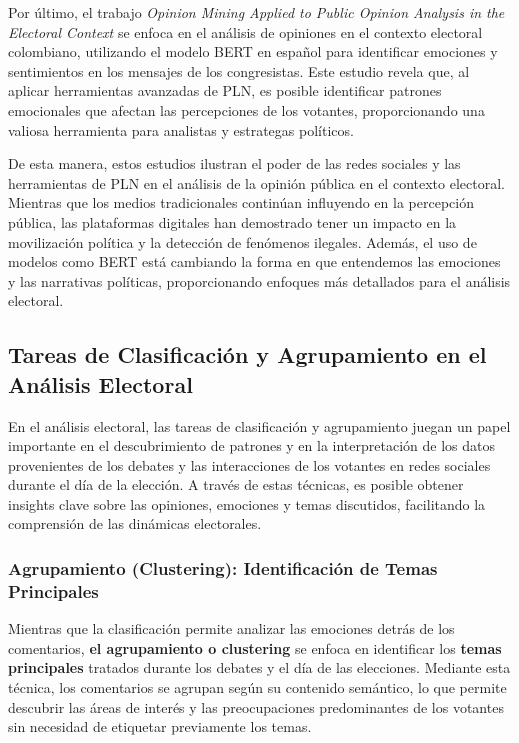 \documentclass[10pt, a4paper]{article}
\begin{document}
	Por último, el trabajo \textit{Opinion Mining Applied to Public Opinion Analysis in the Electoral Context} \parencite{Castiblanco2022} se enfoca en el análisis de opiniones en el contexto electoral colombiano, utilizando el modelo BERT en español para identificar emociones y sentimientos en los mensajes de los congresistas. Este estudio revela que, al aplicar herramientas avanzadas de PLN, es posible identificar patrones emocionales que afectan las percepciones de los votantes, proporcionando una valiosa herramienta para analistas y estrategas políticos. 
	
	De esta manera, estos estudios ilustran el poder de las redes sociales y las herramientas de PLN en el análisis de la opinión pública en el contexto electoral. Mientras que los medios tradicionales continúan influyendo en la percepción pública, las plataformas digitales han demostrado tener un impacto en la movilización política y la detección de fenómenos ilegales. Además, el uso de modelos como BERT está cambiando la forma en que entendemos las emociones y las narrativas políticas, proporcionando enfoques más detallados para el análisis electoral.
	
	
	\subsection{Tareas de Clasificación y Agrupamiento en el Análisis Electoral}
	En el análisis electoral, las tareas de clasificación y agrupamiento juegan un papel importante en el descubrimiento de patrones y en la interpretación de los datos provenientes de los debates y las interacciones de los votantes en redes sociales durante el día de la elección. A través de estas técnicas, es posible obtener insights clave sobre las opiniones, emociones y temas discutidos, facilitando la comprensión de las dinámicas electorales.
	
	\subsubsection{Agrupamiento (Clustering): Identificación de Temas Principales}
	Mientras que la clasificación permite analizar las emociones detrás de los comentarios, \textbf{el agrupamiento o clustering} se enfoca en identificar los \textbf{temas principales} tratados durante los debates y el día de las elecciones. Mediante esta técnica, los comentarios se agrupan según su contenido semántico, lo que permite descubrir las áreas de interés y las preocupaciones predominantes de los votantes sin necesidad de etiquetar previamente los temas.
	
\end{document}
